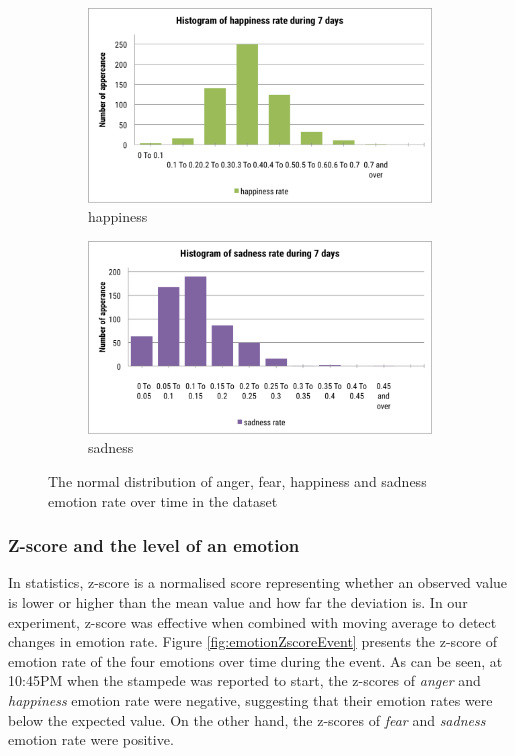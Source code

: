 \begin{figure}[!h]
\begin{subfigure}{0.5\textwidth}
\end{subfigure}
\begin{subfigure}{0.5\textwidth}
\centering    
\includegraphics[width=0.98\linewidth]{HistogramHappinessWeek}
\caption{happiness}
\label{fig:histogramHappinessWeek}
\end{subfigure}%
\begin{subfigure}{0.5\textwidth}
\centering    
\includegraphics[width=0.98\linewidth]{HistogramSadnessWeek}
\caption{sadness}
\label{fig:histogramSadnessWeek}
\end{subfigure}
\caption{The normal distribution of anger, fear, happiness and sadness emotion rate over time in the dataset}
\label{fig:histogramWeek}
\end{figure}

\subsubsection{Z-score and the level of an emotion}
In statistics, z-score is a normalised score representing whether an observed value is lower or higher than the mean value and how far the deviation is. In our experiment, z-score was effective when combined with moving average to detect changes in emotion rate. Figure \ref{fig:emotionZscoreEvent} presents the z-score of emotion rate of the four emotions over time during the event. As can be seen, at 10:45PM when the stampede was reported to start, the z-scores of \textit{anger} and \textit{happiness} emotion rate were negative, suggesting that their emotion rates were below the expected value. On the other hand, the z-scores of \textit{fear} and \textit{sadness} emotion rate were positive. 

